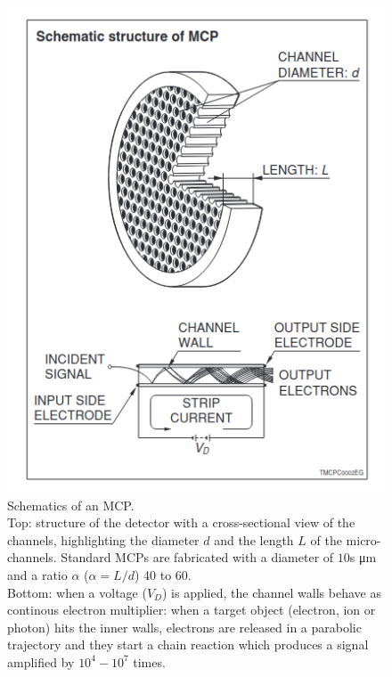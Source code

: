 \begin{figure}
\begin{minipage}[c]{.45\linewidth}
    \includegraphics[width=1\linewidth]{Images/TestBeam_setup/MCP diagram HAMAMATSU.png}
\end{minipage}
\hfill
\begin{minipage}[c]{.5\linewidth}
    \caption{
    Schematics of an MCP.\\ 
    Top: structure of the detector with a cross-sectional view of the channels, highlighting the diameter $d$ and the length $L$ of the micro-channels. Standard MCPs are fabricated with a diameter of $10$s \unit{\micro\meter} and a ratio $\alpha$ ($\alpha = L / d$) 40 to 60.\\
    Bottom: when a voltage ($V_D$) is applied, the channel walls behave as continous electron multiplier: when a target object (electron, ion or photon) hits the inner walls, electrons are released in a parabolic trajectory and they start a chain reaction which produces a signal amplified by $10^4-10^7$ times.}
\end{minipage}
\label{fig:MCP_diagrame}
\end{figure}


